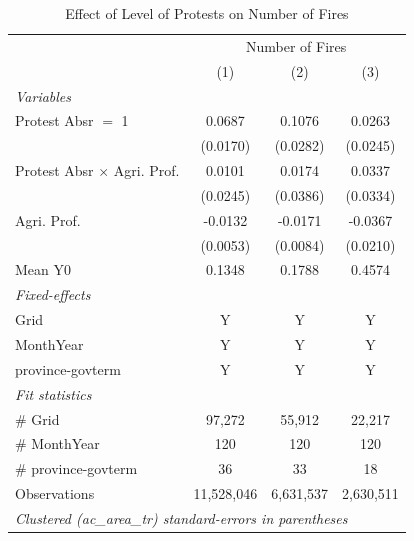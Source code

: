 
\begin{table}[htbp]
   \caption{\label{tab:protest_treat_main} Effect of Level of Protests on Number of Fires}
   \centering
   \begin{tabular}{lccc}
      \tabularnewline \midrule \midrule
       & \multicolumn{3}{c}{Number of Fires}\\
                                         & (1)        & (2)       & (3)\\  
      \midrule
      \emph{Variables}\\
      Protest Absr $=$ 1                 & 0.0687     & 0.1076    & 0.0263\\   
                                         & (0.0170)   & (0.0282)  & (0.0245)\\   
      Protest Absr $\times$ Agri. Prof.  & 0.0101     & 0.0174    & 0.0337\\   
                                         & (0.0245)   & (0.0386)  & (0.0334)\\   
      Agri. Prof.                        & -0.0132    & -0.0171   & -0.0367\\   
                                         & (0.0053)   & (0.0084)  & (0.0210)\\   
      \hline Mean Y0                     & 0.1348     & 0.1788    & 0.4574\\  
      \midrule
      \emph{Fixed-effects}\\
      Grid                               & Y          & Y         & Y\\  
      MonthYear                          & Y          & Y         & Y\\  
      province-govterm                   & Y          & Y         & Y\\  
      \midrule
      \emph{Fit statistics}\\
      \# Grid                            & 97,272     & 55,912    & 22,217\\  
      \# MonthYear                       & 120        & 120       & 120\\  
      \# province-govterm                & 36         & 33        & 18\\  
      Observations                       & 11,528,046 & 6,631,537 & 2,630,511\\  
      \midrule \midrule
      \multicolumn{4}{l}{\emph{Clustered (ac\_area\_tr) standard-errors in parentheses}}\\
   \end{tabular}
\end{table}


